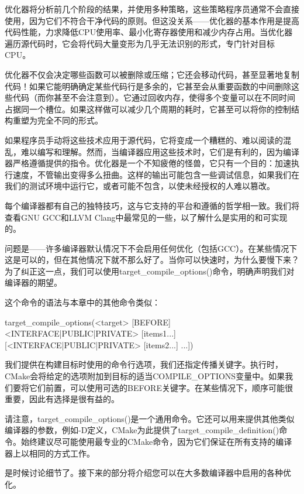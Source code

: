 
优化器将分析前几个阶段的结果，并使用多种策略，这些策略程序员通常不会直接使用，因为它们不符合干净代码的原则。但这没关系——优化器的基本作用是提高代码性能，力求降低CPU使用率、最小化寄存器使用和减少内存占用。当优化器遍历源代码时，它会将代码大量变形为几乎无法识别的形式，专门针对目标CPU。

优化器不仅会决定哪些函数可以被删除或压缩；它还会移动代码，甚至显著地复制代码！如果它能明确确定某些代码行是多余的，它甚至会从重要函数的中间删除这些代码（而你甚至不会注意到）。它通过回收内存，使得多个变量可以在不同时间占据同一个槽位。如果这样做可以减少几个周期的耗时，它甚至可以将你的控制结构重塑为完全不同的形式。

如果程序员手动将这些技术应用于源代码，它将变成一个糟糕的、难以阅读的混乱，难以编写和理解。然而，当编译器应用这些技术时，它们是有利的，因为编译器严格遵循提供的指令。优化器是一个不知疲倦的怪兽，它只有一个目的：加速执行速度，不管输出变得多么扭曲。这样的输出可能包含一些调试信息，如果我们在我们的测试环境中运行它，或者可能不包含，以使未经授权的人难以篡改。

每个编译器都有自己的独特技巧，这与它支持的平台和遵循的哲学相一致。我们将查看GNU GCC和LLVM Clang中最常见的一些，以了解什么是实用的和可实现的。

问题是——许多编译器默认情况下不会启用任何优化（包括GCC）。在某些情况下这是可以的，但在其他情况下就不那么好了。当你可以快速时，为什么要慢下来？为了纠正这一点，我们可以使用target\_compile\_options()命令，明确声明我们对编译器的期望。

这个命令的语法与本章中的其他命令类似：

\begin{shell}
target_compile_options(<target> [BEFORE]
                       <INTERFACE|PUBLIC|PRIVATE> [items1...]
                      [<INTERFACE|PUBLIC|PRIVATE> [items2...]
...])
\end{shell}

我们提供在构建目标时使用的命令行选项，我们还指定传播关键字。执行时，CMake会将给定的选项附加到目标的适当COMPILE\_OPTIONS变量中。如果我们要将它们前置，可以使用可选的BEFORE关键字。在某些情况下，顺序可能很重要，因此有选择是很有益的。

请注意，target\_compile\_options()是一个通用命令。它还可以用来提供其他类似编译器的参数，例如-D定义，CMake为此提供了target\_compile\_definition()命令。始终建议尽可能使用最专业的CMake命令，因为它们保证在所有支持的编译器上以相同的方式工作。

是时候讨论细节了。接下来的部分将介绍您可以在大多数编译器中启用的各种优化。


